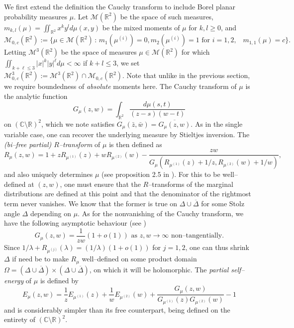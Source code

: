 \documentclass{amsart}
\theoremstyle{definition}
\theoremstyle{remark}
\numberwithin{equation}{section}
\begin{document}
We first extend the definition the Cauchy transform to include Borel planar probability measures $\mu$. Let $\mathcal{M}(\mathbb{R}^2)$ be the space of such measures, 
    $m_{k,l}(\mu) = {\iint_{\mathbb{R}^2}} x^ky^l d\mu(x,y)$
be the mixed moments of $\mu$ for $k,l\geq 0$,  and
\[
    \mathcal{M}_{0,c}(\mathbb{R}^2) := \big\{\mu\in\mathcal{M}(\mathbb{R}^2)\,:\, m_1(\mu^{(i)})=0,  m_2(\mu^{(i)})=1 \mbox{ for $i=1,2,$ }\, m_{1,1}(\mu)=c\big\}.
\]
Letting $\mathcal{M}^{3}(\mathbb{R}^2)$ be the space of measures $\mu\in \mathcal{M}(\mathbb{R}^2)$ for which $\iint_{k+\ell\leq 3}|x|^k|y|^\ell d\mu<\infty$ if $k+l\leq 3$, we set $\mathcal{M}_{0,c}^3(\mathbb{R}^2):=\mathcal{M}^3(\mathbb{R}^2)\cap \mathcal{M}_{0,c}(\mathbb{R}^2)$. Note that unlike in the previous section, we require boundedness of \textit{absolute} moments here. The Cauchy transform of $\mu $ is the analytic function
\[  
    G_\mu(z,w) = \int_{\mathbb{R}^2}\frac{d\mu(s,t)}{(z-s)(w-t)}
\]
 on $(\mathbb{C}\setminus \mathbb{R})^2$, which we note satisfies $G_\mu(\bar{z},\bar{w})=\overline{G_\mu(z,w)}$. As in the single variable case, one can recover the underlying measure by Stieltjes inversion. The \textit{(bi--free partial) $R$--transform} of $\mu$ is then defined as 
\begin{equation}\label{biR}
    R_\mu(z,w)=1+zR_{\mu^{(1)}}(z)+wR_{\mu^{(2)}}(w)-\frac{zw}{G_\mu(R_{\mu^{(1)}}(z)+1/z,R_{\mu^{(2)}}(w)+1/w)},
\end{equation}
and also uniquely determines $\mu$ (see proposition 2.5 in \cite{HuangWang}).
For this to be well--defined at $(z,w)$, one must ensure that the $R$--transforms of the marginal distributions are defined at this point and that the denominator of the rightmost term never vanishes. We know that the former is true on $\Delta\cup\overline{\Delta}$ for some Stolz angle $\Delta$ depending on $\mu$. As for the nonvanishing of the Cauchy transform, we have the following asymptotic behaviour (see \cite{HuangWang}) 
\[
    G_\mu(z,w)=\frac{1}{zw}(1+o(1)) \mbox{ as $z, w\to \infty$ non--tangentially}.
\]
Since $1/\lambda+R_{\mu^{(j)}}(\lambda)=(1/\lambda)(1+o(1))$ for $j=1,2$, one can thus shrink $\Delta$ if need be to make $R_\mu$ well--defined on some product domain $\Omega=(\Delta\cup\overline{\Delta})\times (\Delta\cup\overline{\Delta})$, on which it will be holomorphic. The \textit{partial self--energy} of $\mu$ is defined by 
\[
    E_{\mu}(z,w)=\frac{1}{z}E_{\mu^{(1)}}(z)+\frac{1}{w}E_{\mu^{(2)}}(w)+\frac{G_\mu(z,w)}{G_{\mu^{(1)}}(z)G_{\mu^{(2)}}(w)}-1
\]
and is considerably simpler than its free counterpart, being defined on the entirety of $(\mathbb{C}\setminus \mathbb{R})^2$. 
\end{document}
